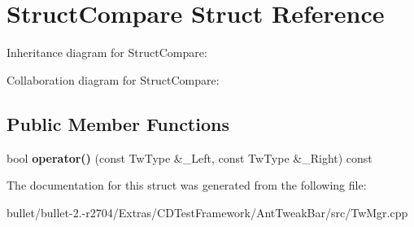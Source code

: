 \hypertarget{struct_struct_compare}{\section{Struct\+Compare Struct Reference}
\label{struct_struct_compare}
}


Inheritance diagram for Struct\+Compare\+:


Collaboration diagram for Struct\+Compare\+:
\subsection*{Public Member Functions}
\begin{DoxyCompactItemize}
\item 
\hypertarget{struct_struct_compare_ad9ebae4540fd43a7b350485a13b6b8bb}{bool {\bfseries operator()} (const Tw\+Type \&\+\_\+\+Left, const Tw\+Type \&\+\_\+\+Right) const }\label{struct_struct_compare_ad9ebae4540fd43a7b350485a13b6b8bb}

\end{DoxyCompactItemize}


The documentation for this struct was generated from the following file\+:\begin{DoxyCompactItemize}
\item 
bullet/bullet-\/2.-\/r2704/\+Extras/\+C\+D\+Test\+Framework/\+Ant\+Tweak\+Bar/src/Tw\+Mgr.\+cpp\end{DoxyCompactItemize}
